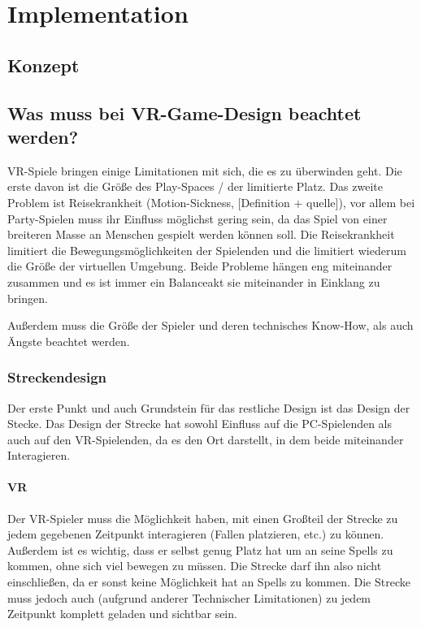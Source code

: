 \chapter{Implementation}

\section{Konzept}

\section{Was muss bei VR-Game-Design beachtet werden?}

VR-Spiele bringen einige Limitationen mit sich, die es zu überwinden geht. Die erste davon ist die Größe des Play-Spaces / der limitierte Platz. Das zweite Problem ist Reisekrankheit (Motion-Sickness, [Definition + quelle]), vor allem bei Party-Spielen muss ihr Einfluss möglichst gering sein, da das Spiel von einer breiteren Masse an Menschen gespielt werden können soll. Die Reisekrankheit limitiert die Bewegungsmöglichkeiten der Spielenden und die limitiert wiederum die Größe der virtuellen Umgebung. Beide Probleme hängen eng miteinander zusammen und es ist immer ein Balanceakt sie miteinander in Einklang zu bringen. 

Außerdem muss die Größe der Spieler und deren technisches Know-How, als auch Ängste beachtet werden. 

\subsection{Streckendesign}

Der erste Punkt und auch Grundstein für das restliche Design ist das Design der Stecke. Das Design der Strecke hat sowohl Einfluss auf die PC-Spielenden als auch auf den VR-Spielenden, da es den Ort darstellt, in dem beide miteinander Interagieren.

\subsubsection{VR}

Der VR-Spieler muss die Möglichkeit haben, mit einen Großteil der Strecke zu jedem gegebenen Zeitpunkt interagieren (Fallen platzieren, etc.) zu können. Außerdem ist es wichtig, dass er selbst genug Platz hat um an seine Spells zu kommen, ohne sich viel bewegen zu müssen. Die Strecke darf ihn also nicht einschließen, da er sonst keine Möglichkeit hat an Spells zu kommen. Die Strecke muss jedoch auch (aufgrund anderer Technischer Limitationen) zu jedem Zeitpunkt komplett geladen und sichtbar sein.

